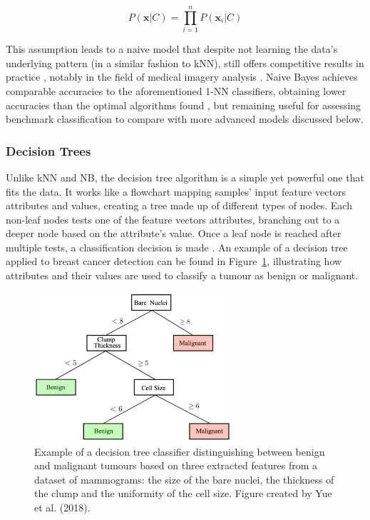 \begin{equation}
\label{eq:naive-bayes}
    P(\textbf{x}|C)=\prod_{i=1}^{n}P(\textbf{x}_i|C)
\end{equation}

This assumption leads to a naive model that despite not learning the data's underlying pattern (in a similar fashion to kNN), still offers competitive results in practice \cite{russell2002artificial}, notably in the field of medical imagery analysis \cite{rish2001empirical}. Naive Bayes achieves comparable accuracies to the aforementioned 1-NN classifiers, obtaining lower accuracies than the optimal algorithms found \cite{Yue2018} \cite{Montazeri2016}, but remaining useful for assessing benchmark classification to compare with more advanced models discussed below.

\subsubsection{Decision Trees}

Unlike kNN and NB, the decision tree algorithm is a simple yet powerful one that fits the data. It works like a flowchart mapping samples' input feature vectors attributes and values, creating a tree made up of different types of nodes. Each non-leaf nodes tests one of the feature vectors attributes, branching out to a deeper node based on the attribute's value. Once a leaf node is reached after multiple tests, a classification decision is made \cite{quinlan2014c4}. An example of a decision tree applied to breast cancer detection can be found in Figure~\ref{fig:litsurvey-dt-example}, illustrating how attributes and their values are used to classify a tumour as benign or malignant.

\begin{figure}[ht]
\centerline{\includegraphics[width=0.65\textwidth]{Dissertation/figures/litsurvey/dt.png}}
\caption{\label{fig:litsurvey-dt-example}Example of a decision tree classifier distinguishing between benign and malignant tumours based on three extracted features from a dataset of mammograms: the size of the bare nuclei, the thickness of the clump and the uniformity of the cell size. Figure created by Yue et al. (2018).}
\end{figure}

